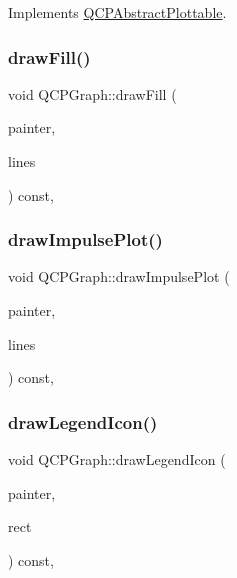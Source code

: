 Implements \hyperlink{class_q_c_p_abstract_plottable_a453f676a5cee7bf846c5f0fa05ea84b3}{Q\+C\+P\+Abstract\+Plottable}.

\mbox{\label{class_q_c_p_graph_a67c5ea573f604efd8bf121a0b7a380d1}} 
\subsubsection{\texorpdfstring{draw\+Fill()}{drawFill()}}
{\footnotesize\ttfamily void Q\+C\+P\+Graph\+::draw\+Fill (\begin{DoxyParamCaption}\item[{\hyperlink{class_q_c_p_painter}{Q\+C\+P\+Painter} $\ast$}]{painter,  }\item[{Q\+Vector$<$ Q\+PointF $>$ $\ast$}]{lines }\end{DoxyParamCaption}) const\hspace{0.3cm}{\ttfamily [protected]}, {\ttfamily [virtual]}}

\mbox{\label{class_q_c_p_graph_a217ef6bf6c5689eb1dcbe02187d2cc61}} 
\subsubsection{\texorpdfstring{draw\+Impulse\+Plot()}{drawImpulsePlot()}}
{\footnotesize\ttfamily void Q\+C\+P\+Graph\+::draw\+Impulse\+Plot (\begin{DoxyParamCaption}\item[{\hyperlink{class_q_c_p_painter}{Q\+C\+P\+Painter} $\ast$}]{painter,  }\item[{const Q\+Vector$<$ Q\+PointF $>$ \&}]{lines }\end{DoxyParamCaption}) const\hspace{0.3cm}{\ttfamily [protected]}, {\ttfamily [virtual]}}

\mbox{\label{class_q_c_p_graph_a6efbab06c400bdb15e28b2d0a4ecc18a}} 
\subsubsection{\texorpdfstring{draw\+Legend\+Icon()}{drawLegendIcon()}}
{\footnotesize\ttfamily void Q\+C\+P\+Graph\+::draw\+Legend\+Icon (\begin{DoxyParamCaption}\item[{\hyperlink{class_q_c_p_painter}{Q\+C\+P\+Painter} $\ast$}]{painter,  }\item[{const Q\+RectF \&}]{rect }\end{DoxyParamCaption}) const\hspace{0.3cm}{\ttfamily [protected]}, {\ttfamily [virtual]}}



